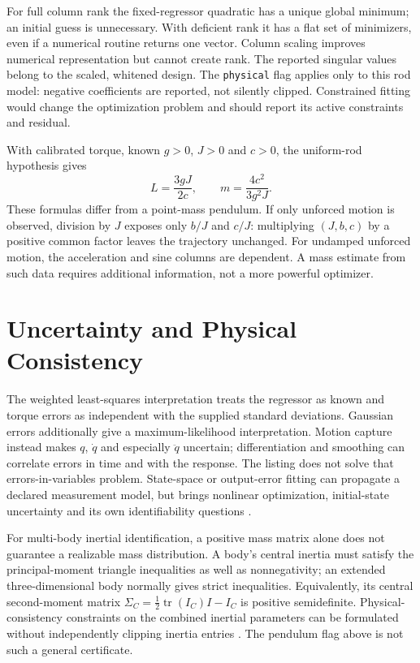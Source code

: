 For full column rank the fixed-regressor quadratic has a unique global
minimum; an initial guess is unnecessary. With deficient rank it has a
flat set of minimizers, even if a numerical routine returns one vector.
Column scaling improves numerical representation but cannot create rank.
The reported singular values belong to the scaled, whitened design.
The \texttt{physical} flag applies only to this rod model: negative coefficients
are reported, not silently clipped. Constrained fitting would change the
optimization problem and should report its active constraints and residual.

With calibrated torque, known $g>0$, $J>0$ and $c>0$, the uniform-rod
hypothesis gives
\begin{equation}
  L=\frac{3gJ}{2c},\qquad
  m=\frac{4c^2}{3g^2J}.
\end{equation}
These formulas differ from a point-mass pendulum. If only unforced motion is
observed, division by $J$ exposes only $b/J$ and $c/J$: multiplying
$(J,b,c)$ by a positive common factor leaves the trajectory unchanged.
For undamped unforced motion, the acceleration and sine columns are dependent.
A mass estimate from such data requires additional information, not a more
powerful optimizer.

\section{Uncertainty and Physical Consistency}

The weighted least-squares interpretation treats the regressor as known and
torque errors as independent with the supplied standard deviations. Gaussian
errors additionally give a maximum-likelihood interpretation. Motion capture
instead makes $q$, $\dot q$ and especially $\ddot q$ uncertain; differentiation
and smoothing can correlate errors in time and with the response. The listing
does not solve that errors-in-variables problem. State-space or output-error
fitting can propagate a declared measurement model, but brings nonlinear
optimization, initial-state uncertainty and its own identifiability questions
\cite{TedrakeSystemIdentificationReview}.

For multi-body inertial identification, a positive mass matrix alone does not
guarantee a realizable mass distribution. A body's central inertia must satisfy
the principal-moment triangle inequalities as well as nonnegativity; an extended
three-dimensional body normally gives strict inequalities. Equivalently, its
central second-moment matrix
$\Sigma_C=\tfrac12\operatorname{tr}(I_C)I-I_C$ is positive semidefinite.
Physical-consistency constraints on the combined inertial parameters can be
formulated without independently clipping inertia entries
\cite{WensingPhysicalIdentificationReview}. The pendulum flag above is not
such a general certificate.

